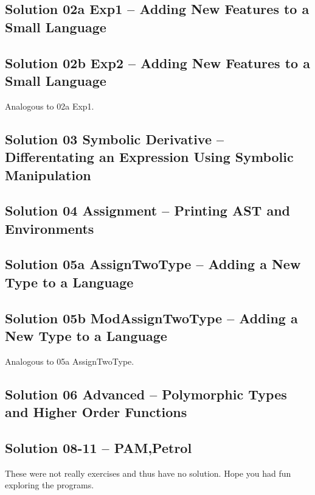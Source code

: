 \documentclass[10.5pt,a4]{article}
\begin{document}
\subsection{Solution 02a Exp1 –  Adding New Features to a Small Language}


\subsection{Solution 02b Exp2 –  Adding New Features to a Small Language}
Analogous to 02a Exp1.

\subsection{Solution 03 Symbolic Derivative –  Differentating an Expression Using Symbolic Manipulation}


\subsection{Solution 04 Assignment – Printing AST and Environments}


\subsection{Solution 05a AssignTwoType – Adding a New Type to a Language}


\subsection{Solution 05b ModAssignTwoType – Adding a New Type to a Language}
Analogous to 05a AssignTwoType.

\subsection{Solution 06 Advanced – Polymorphic Types and Higher Order Functions}


\subsection{Solution 08-11 – PAM,Petrol}
These were not really exercises and thus have no solution. Hope you had fun exploring the programs.
\end{document}
